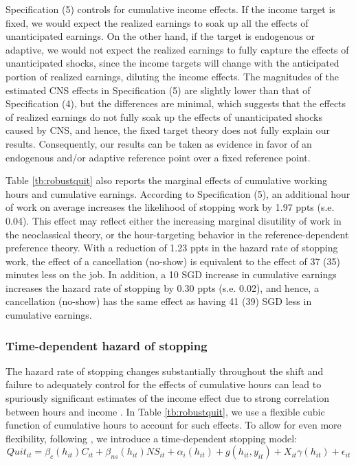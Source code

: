 \documentclass[reviewmode,AEJ]{AEA}
\begin{document}
Specification (5) controls for cumulative income effects. If the income target is fixed, we would expect the realized earnings to soak up all the effects of unanticipated earnings. On the other hand, if the target is endogenous or adaptive, we would not expect the realized earnings to fully capture the effects of unanticipated shocks, since the income targets will change with the anticipated portion of realized earnings, diluting the income effects. The magnitudes of the estimated CNS effects in Specification (5) are slightly lower than that of Specification (4), but the differences 
are minimal, which suggests that the effects of realized earnings do not fully soak up the effects of unanticipated shocks caused by CNS, and hence, the fixed target theory does not fully explain our results. Consequently, our results can be taken as evidence in favor of an endogenous and/or adaptive reference point over a fixed reference point. 


Table \ref{tb:robustquit} also reports the marginal effects of cumulative working hours and cumulative earnings. According to Specification (5), an additional hour of work on average increases the likelihood of stopping work by 1.97 ppts (s.e. 0.04). This effect may reflect either the increasing marginal disutility of work in the neoclassical theory, or the hour-targeting behavior in the reference-dependent preference theory. With a reduction of 1.23 ppts in the hazard rate of stopping work, the effect of a cancellation (no-show) is equivalent to the effect of 37 (35) minutes less on the job. %
In addition, a 10 SGD increase in cumulative earnings increases the hazard rate of stopping by 0.30 ppts (s.e. 0.02), and hence, a cancellation (no-show) has the same effect as having 41 (39) SGD less in cumulative earnings.%

\subsubsection{Time-dependent hazard of stopping}
The hazard rate of stopping changes substantially throughout the shift and failure to adequately control for the effects of cumulative hours can lead to spuriously significant estimates of the income effect due to strong correlation between hours and income%
. In Table \ref{tb:robustquit}, we use a flexible cubic function of cumulative hours to account for such effects. To allow for even more flexibility, following \cite{thakral2018daily}, we introduce a time-dependent stopping model:
\begin{equation}
\label{eq:lwr}
    Quit_{it} = \beta_c(h_{it})C_{it} + \beta_{ns}(h_{it}){NS}_{it} + \alpha_i(h_{it}) + g(h_{it}, y_{it}) + X_{it}\gamma(h_{it}) + \epsilon_{it}
\end{equation}
\end{document}
